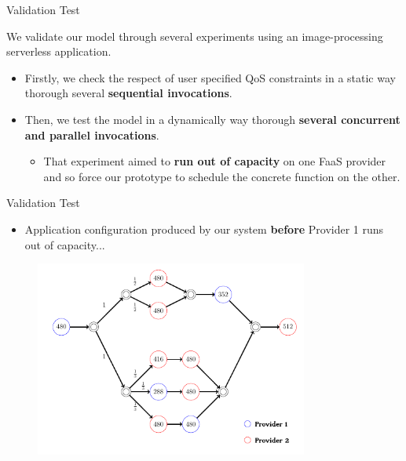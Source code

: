 \documentclass[13.5pt]{beamer}
\newcommand{\B}[1]{\textcolor{TorVergataColor}{\textbf{#1}}}
\begin{document}
\begin{frame}{Validation Test}
	
\begin{block}{}
	\centering
	We validate our model through several experiments using an image-processing serverless application.
\end{block}
	\vspace{\baselineskip}
\begin{itemize}
	\item Firstly, we check the respect of user specified QoS constraints in a static way thorough several \B{sequential invocations}.
	\vspace{\baselineskip}
	\item Then, we test the model in a dynamically way thorough \B{several concurrent and parallel invocations}. 
	\begin{itemize}
	\item That experiment aimed to \B{run out of capacity} on one FaaS provider and so force our prototype to schedule the concrete function on the other.
	\end{itemize}
\end{itemize}

\end{frame}


\begin{frame}{Validation Test}
	
	\begin{itemize}
		\item Application configuration produced by our system \B{before} Provider 1 runs out of capacity...
	\end{itemize}
	
	\begin{figure}[h]
		\centering
		\includegraphics[width=0.8\textwidth,height=0.55\columnwidth]{../Images/EXP1ForSlide.png}
	\end{figure}
	
	
\end{frame}
\end{document}
